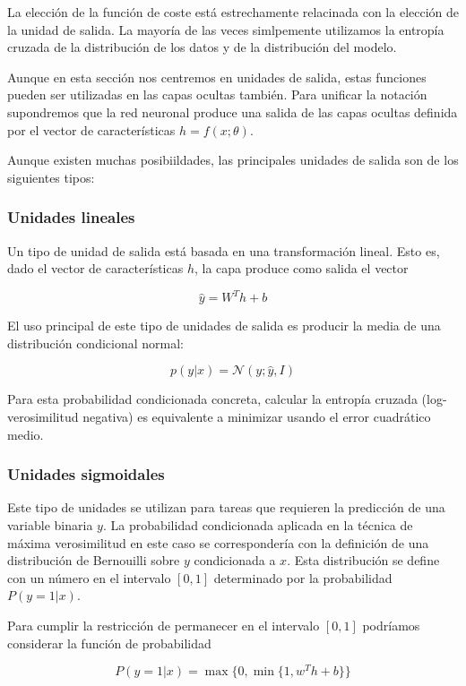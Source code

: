 	La elección de la función de coste está estrechamente relacinada con la elección de la unidad de salida. La mayoría de las veces simlpemente utilizamos la entropía cruzada de la distribución de los datos y de la distribución del modelo.
	
	Aunque en esta sección nos centremos en unidades de salida, estas funciones pueden ser	utilizadas en las capas ocultas también. Para unificar la  notación supondremos que la red neuronal produce una salida de las capas ocultas definida por el vector de características $h = f(x; \theta)$. 
	
	Aunque existen muchas posibiildades, las principales unidades de salida son de los siguientes tipos:
	
	\subsubsection{Unidades lineales}
		
		Un tipo de unidad de salida está basada en una transformación lineal. Esto es, dado el vector de características $h$, la capa produce como salida el vector 
		
		$$
			\hat{y} = W^Th + b
		$$ 
		
		El uso principal de este tipo de unidades de salida es producir la media de una distribución condicional normal:
		
		$$
			p(y | x) = \mathcal{N}(y; \hat{y}, I)
		$$ 
		
		Para esta probabilidad condicionada concreta, calcular la entropía cruzada (log-verosimilitud negativa) es equivalente a minimizar usando el error cuadrático medio.
		
	\subsubsection{Unidades sigmoidales}
	
		Este tipo de unidades se utilizan para tareas que requieren la predicción de una variable binaria $y$. La probabilidad condicionada aplicada en la técnica de máxima verosimilitud en este caso se correspondería con la definición de una distribución de Bernouilli sobre $y$ condicionada a $x$. Esta distribución se define con un número en el intervalo $[0,1]$ determinado por la probabilidad  $P(y = 1 | x)$. 
		
		Para cumplir la restricción de permanecer en el intervalo $[0,1]$ podríamos considerar la función de probabilidad
		
		$$
			P(y = 1|x) = \max\{0, \min\{ 1, w^Th + b\}\}
		$$
		
